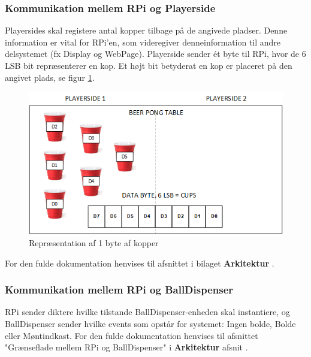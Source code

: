 \documentclass[Rapport/Rapport_main.tex]{subfiles}
\begin{document}
\subsubsection{Kommunikation mellem RPi og Playerside}
Playersides skal registere antal kopper tilbage på de angivede pladser. Denne information er vital for RPi’en, som videregiver denneinformation til andre delsystemet (fx Display og WebPage). Playerside sender ét byte til RPi, hvor de 6 LSB bit repræsenterer en kop. Et højt bit betyderat en kop er placeret på den angivet plads, se figur \ref{fig:cups_setup}.
\begin{figure}[H]
    \centering
    \includegraphics[width=\textwidth]{Arkitektur/Grenseflader/Graphics/cups.png}
    \caption{Repræsentation af 1 byte af kopper}
    \label{fig:cups_setup}
\end{figure}
For den fulde dokumentation henvises til afsnittet  i bilaget \textbf{Arkitektur} .
\subsubsection{Kommunikation mellem RPi og BallDispenser}
RPi sender diktere hvilke tilstande BallDispenser-enheden skal instantiere, og BallDispenser sender hvilke events som opstår for systemet: Ingen bolde, Bolde eller Møntindkast. For den fulde dokumentation henvises til afsnittet "Grænseflade mellem RPi og BallDispenser" i \textbf{Arkitektur} afsnit .
\end{document}
